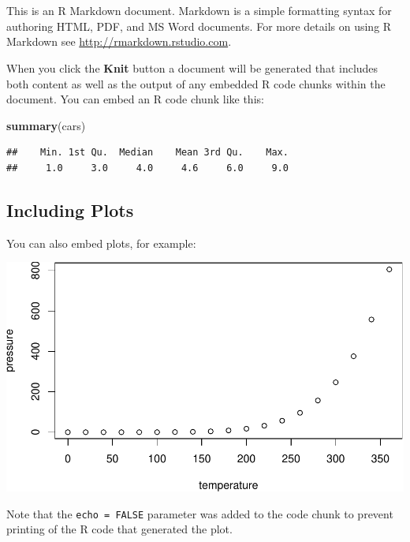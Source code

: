 \documentclass[]{book}
\makeatletter
\newenvironment{Shaded}{\begin{snugshade}}{\end{snugshade}}
\newcommand{\KeywordTok}[1]{\textcolor[rgb]{0.13,0.29,0.53}{\textbf{#1}}}
\newcommand{\NormalTok}[1]{#1}
\newenvironment{kframe}{%
\medskip{}
\setlength{\fboxsep}{.8em}
 \def\at@end@of@kframe{}%
 \ifinner\ifhmode%
  \def\at@end@of@kframe{\end{minipage}}%
  \begin{minipage}{\columnwidth}%
 \fi\fi%
 \def\FrameCommand##1{\hskip\@totalleftmargin \hskip-\fboxsep
 \colorbox{shadecolor}{##1}\hskip-\fboxsep
     \hskip-\linewidth \hskip-\@totalleftmargin \hskip\columnwidth}%
 \MakeFramed {\advance\hsize-\width
   \@totalleftmargin\z@ \linewidth\hsize
   \@setminipage}}%
 {\par\unskip\endMakeFramed%
 \at@end@of@kframe}
\renewenvironment{Shaded}{\begin{kframe}}{\end{kframe}}
\makeatother
\begin{document}
\hypertarget{section-8}{%
\chapter{}\label{section-8}}

This is an R Markdown document. Markdown is a simple formatting syntax for authoring HTML, PDF, and MS Word documents. For more details on using R Markdown see \url{http://rmarkdown.rstudio.com}.

When you click the \textbf{Knit} button a document will be generated that includes both content as well as the output of any embedded R code chunks within the document. You can embed an R code chunk like this:

\begin{Shaded}
\begin{Highlighting}[]
\KeywordTok{summary}\NormalTok{(cars)}
\end{Highlighting}
\end{Shaded}

\begin{verbatim}
##    Min. 1st Qu.  Median    Mean 3rd Qu.    Max. 
##     1.0     3.0     4.0     4.6     6.0     9.0
\end{verbatim}

\hypertarget{including-plots}{%
\section{Including Plots}\label{including-plots}}

You can also embed plots, for example:

\includegraphics{bioinfBookXIE186_files/figure-latex/pressure-1.pdf}

Note that the \texttt{echo\ =\ FALSE} parameter was added to the code chunk to prevent printing of the R code that generated the plot.
\end{document}
